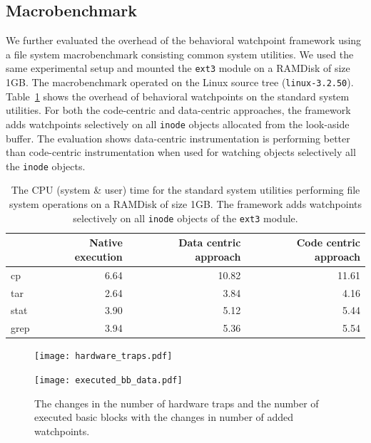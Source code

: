 \subsection{Macrobenchmark}
We further evaluated the overhead of the behavioral watchpoint framework using a file system macrobenchmark consisting common system utilities. We used the same experimental setup and mounted the \texttt{ext3} module on a RAMDisk of size 1GB. The macrobenchmark operated on the Linux source tree (\texttt{linux-3.2.50}). Table~\ref{table:system_utils-benchmark} shows the overhead of behavioral watchpoints on the standard system utilities. For both the code-centric and data-centric approaches, the framework adds watchpoints selectively on all \texttt{inode} objects allocated from the look-aside buffer. The evaluation shows data-centric instrumentation is performing better than code-centric instrumentation when used for watching objects selectively all the \texttt{inode} objects.


\begin{table}
\begin{center}
\vspace{1em}
\begin{tabular}{|l|r|r|r|}
  \hline
   & Native execution & Data centric approach & Code centric approach \\
  \hline
  cp & 6.64 & 10.82 & 11.61\\
  \hline
  tar & 2.64 & 3.84 & 4.16\\
  \hline
  stat & 3.90 & 5.12 & 5.44\\
  \hline
  grep & 3.94 & 5.36 & 5.54\\
  \hline
\end{tabular}
\caption[Performance impact of the watchpoint framework on macrobenchmark]{\label{table:system_utils-benchmark}The CPU (system \& user) time for the standard system utilities performing file system operations on a RAMDisk of size 1GB. The framework adds watchpoints selectively on all \texttt{inode} objects of the \texttt{ext3} module.}
\end{center}
\end{table}


\begin{figure}[t!]
\begin{multicols}{2}
\begin{center}
\texttt{[image: hardware\_traps.pdf]}
\end{center}
\columnbreak
\begin{center}
\texttt{[image: executed\_bb\_data.pdf]}
\end{center}
\end{multicols}
\caption[Cost profile of the watchpoint framework in terms of number of added watchpoints.]{\label{fig:traps_profile}The changes in the number of hardware traps and the number of executed basic blocks with the changes in number of added watchpoints.}
\end{figure}

